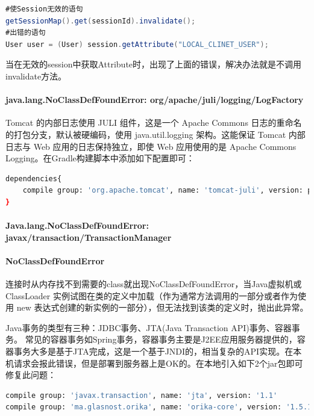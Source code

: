 \documentclass[letter]{book}
\begin{document}
\begin{lstlisting}[language=Java]
#使Session无效的语句
getSessionMap().get(sessionId).invalidate();
#出错的语句
User user = (User) session.getAttribute("LOCAL_CLINET_USER");
\end{lstlisting}

当在无效的session中获取Attribute时，出现了上面的错误，解决办法就是不调用invalidate方法。

\paragraph{java.lang.NoClassDefFoundError: org/apache/juli/logging/LogFactory}

Tomcat 的内部日志使用 JULI 组件，这是一个 Apache Commons 日志的重命名的打包分支，默认被硬编码，使用 java.util.logging 架构。这能保证 Tomcat 内部日志与 Web 应用的日志保持独立，即使 Web 应用使用的是 Apache Commons Logging。在Gradle构建脚本中添加如下配置即可：

\begin{lstlisting}[language=Bash]
dependencies{
	compile group: 'org.apache.tomcat', name: 'tomcat-juli', version: property('tomcat.version')
}
\end{lstlisting}



\paragraph{Java.lang.NoClassDefFoundError: javax/transaction/TransactionManager}

\paragraph{NoClassDefFoundError}

连接时从内存找不到需要的class就出现NoClassDefFoundError，当Java虚拟机或 ClassLoader 实例试图在类的定义中加载（作为通常方法调用的一部分或者作为使用 new 表达式创建的新实例的一部分），但无法找到该类的定义时，抛出此异常。 

Java事务的类型有三种：JDBC事务、JTA(Java Transaction API)事务、容器事务。 常见的容器事务如Spring事务，容器事务主要是J2EE应用服务器提供的，容器事务大多是基于JTA完成，这是一个基于JNDI的，相当复杂的API实现。在本机请求会报此错误，但是部署到服务器上是OK的。在本地引入如下2个jar包即可修复此问题：

\begin{lstlisting}[language=Bash]
compile group: 'javax.transaction', name: 'jta', version: '1.1'
compile group: 'ma.glasnost.orika', name: 'orika-core', version: '1.5.1'
\end{lstlisting}
\end{document}
